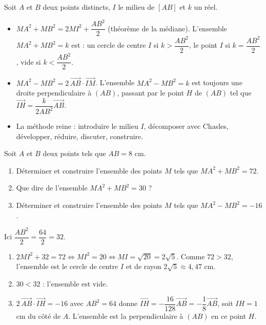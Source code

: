 \documentclass[11pt]{article}
\begin{document}
\begin{aretenir}
Soit $A$ et $B$ deux points distincts, $I$ le milieu de $[AB]$ et $k$ un réel.
\begin{itemize}
\item $MA^2 + MB^2 = 2MI^2 + \dfrac{AB^2}{2}$ (théorème de la médiane). L'ensemble $MA^2 + MB^2 = k$ est : un cercle de centre $I$ si $k > \dfrac{AB^2}{2}$, le point $I$ si $k = \dfrac{AB^2}{2}$, vide si $k < \dfrac{AB^2}{2}$.
\item $MA^2 - MB^2 = 2\,\overrightarrow{AB}\cdot\overrightarrow{IM}$. L'ensemble $MA^2 - MB^2 = k$ est toujours une droite perpendiculaire à $(AB)$, passant par le point $H$ de $(AB)$ tel que $\overrightarrow{IH} = \dfrac{k}{2AB^2}\overrightarrow{AB}$.
\item La méthode reine : introduire le milieu $I$, décomposer avec Chasles, développer, réduire, discuter, construire.
\end{itemize}
\end{aretenir}

\begin{exercice}
Soit $A$ et $B$ deux points tels que $AB = 8$ cm.
\begin{enumerate}
\item Déterminer et construire l'ensemble des points $M$ tels que $MA^2 + MB^2 = 72$.
\item Que dire de l'ensemble $MA^2 + MB^2 = 30$ ?
\item Déterminer et construire l'ensemble des points $M$ tels que $MA^2 - MB^2 = -16$.
\end{enumerate}
\end{exercice}

\begin{corrige}[Exercice]
Ici $\dfrac{AB^2}{2} = \dfrac{64}{2} = 32$.
\begin{enumerate}
\item $2MI^2 + 32 = 72 \iff MI^2 = 20 \iff MI = \sqrt{20} = 2\sqrt{5}$. Comme $72 > 32$, l'ensemble est le cercle de centre $I$ et de rayon $2\sqrt{5} \approx 4{,}47$ cm.
\item $30 < 32$ : l'ensemble est vide.
\item $2\,\overrightarrow{AB}\cdot\overrightarrow{IH} = -16$ avec $AB^2 = 64$ donne $\overrightarrow{IH} = -\dfrac{16}{128}\overrightarrow{AB} = -\dfrac{1}{8}\overrightarrow{AB}$, soit $IH = 1$ cm du côté de $A$. L'ensemble est la perpendiculaire à $(AB)$ en ce point $H$.
\end{enumerate}
\end{corrige}
\end{document}
